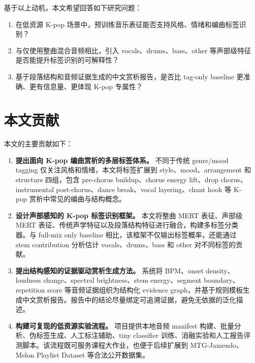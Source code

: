 \documentclass[UTF8,zihao=-4]{ctexart}
\begin{document}
基于以上动机，本文希望回答如下研究问题：

\begin{enumerate}[label=RQ\arabic*.,leftmargin=2.5em]
    \item 在低资源 K-pop 场景中，预训练音乐表征能否支持风格、情绪和编曲标签识别？
    \item 与仅使用整曲混合音频相比，引入 vocals、drums、bass、other 等声部级特征是否能提升标签识别的可解释性？
    \item 基于段落结构和音频证据生成的中文赏析报告，是否比 tag-only baseline 更准确、更有信息量、更体现 K-pop 专属性？
\end{enumerate}

\section{本文贡献}

本文的主要贡献如下：

\begin{enumerate}[leftmargin=2em]
    \item \textbf{提出面向 K-pop 编曲赏析的多层标签体系。} 不同于传统 genre/mood tagging 仅关注风格和情绪，本文将标签扩展到 style、mood、arrangement 和 structure 四组，包含 pre-chorus buildup、chorus energy lift、drop chorus、instrumental post-chorus、dance break、vocal layering、chant hook 等 K-pop 赏析中常见的编曲与结构概念。

    \item \textbf{设计声部感知的 K-pop 标签识别框架。} 本文将整曲 MERT 表征、声部级 MERT 表征、传统声学特征以及段落结构特征进行融合，构建多标签分类器。与 full-mix only baseline 相比，该框架不仅输出标签概率，还能通过 stem contribution 分析估计 vocals、drums、bass 和 other 对不同标签的贡献。

    \item \textbf{提出结构感知的证据驱动赏析生成方法。} 系统将 BPM、onset density、loudness change、spectral brightness、stem energy、segment boundary、repetition score 等音频证据组织为结构化 evidence graph，并基于规则模板生成中文赏析报告。报告中的结论尽量绑定可追溯证据，避免无依据的泛化描述。

    \item \textbf{构建可复现的低资源实验流程。} 项目提供本地音频 manifest 构建、批量分析、伪标签生成、人工标注辅助、tiny classifier 训练、消融实验和人工报告评测脚本。该流程既可服务课程大作业，也便于后续扩展到 MTG-Jamendo\cite{bogdanov2019mtgjamendo}、Melon Playlist Dataset\cite{ferraro2021melon} 等合法公开数据集。
\end{enumerate}
\end{document}
